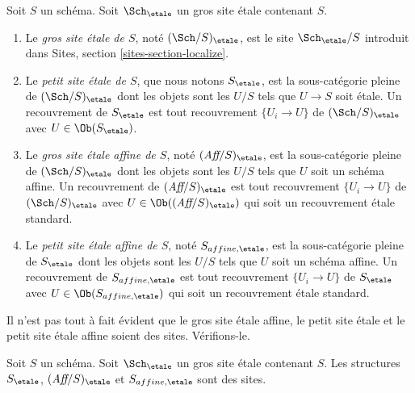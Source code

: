 \begin{definition}
\label{definition-big-small-etale}
Soit $S$ un schéma. Soit $\Sch_\etale$ un gros site
étale contenant $S$.
\begin{enumerate}
\item Le {\it gros site étale de $S$}, noté
$(\Sch/S)_\etale$, est le site
$\Sch_\etale/S$ introduit dans
Sites, section \ref{sites-section-localize}.
\item Le {\it petit site étale de $S$}, que nous notons
$S_\etale$, est la sous-catégorie pleine de
$(\Sch/S)_\etale$
dont les objets sont les $U/S$ tels que $U \to S$ soit étale.
Un recouvrement de $S_\etale$ est tout recouvrement $\{U_i \to U\}$ de
$(\Sch/S)_\etale$ avec $U \in \Ob(S_\etale)$.
\item Le {\it gros site étale affine de $S$}, noté
$(\textit{Aff}/S)_\etale$, est la sous-catégorie pleine de
$(\Sch/S)_\etale$ dont les objets sont les $U/S$
tels que $U$ soit un schéma affine.
Un recouvrement de $(\textit{Aff}/S)_\etale$ est tout recouvrement
$\{U_i \to U\}$ de $(\Sch/S)_\etale$ avec $U \in \Ob((\textit{Aff}/S)_\etale)$
qui soit un recouvrement étale standard.
\item Le {\it petit site étale affine de $S$}, noté
$S_{affine, \etale}$, est la sous-catégorie pleine de $S_\etale$
dont les objets sont les $U/S$ tels que $U$ soit un schéma affine.
Un recouvrement de $S_{affine, \etale}$ est tout recouvrement $\{U_i \to U\}$
de $S_\etale$ avec $U \in \Ob(S_{affine, \etale})$ qui soit un recouvrement
étale standard.
\end{enumerate}
\end{definition}

\noindent
Il n'est pas tout à fait évident que le gros site étale affine,
le petit site étale et le petit site étale affine soient des sites.
Vérifions-le.

\begin{lemma}
\label{lemma-verify-site-etale}
Soit $S$ un schéma. Soit $\Sch_\etale$ un gros site
étale contenant $S$.
Les structures $S_\etale$, $(\textit{Aff}/S)_\etale$ et $S_{affine, \etale}$
sont des sites.
\end{lemma}

